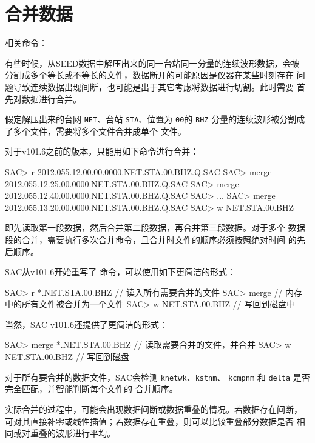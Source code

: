 \section{合并数据}
相关命令：

有些时候，从SEED数据中解压出来的同一台站同一分量的连续波形数据，会被
分割成多个等长或不等长的文件，数据断开的可能原因是仪器在某些时刻存在
问题导致连续数据出现间断，也可能是出于其它考虑将数据进行切割。此时需要
首先对数据进行合并。

假定解压出来的台网 \texttt{NET}、台站 \texttt{STA}、位置为 \texttt{00}的
\texttt{BHZ} 分量的连续波形被分割成了多个文件，需要将多个文件合并成单个
文件。

对于v101.6之前的版本，只能用如下命令进行合并：
\begin{SACCode}
SAC> r 2012.055.12.00.00.0000.NET.STA.00.BHZ.Q.SAC
SAC> merge 2012.055.12.25.00.0000.NET.STA.00.BHZ.Q.SAC
SAC> merge 2012.055.12.40.00.0000.NET.STA.00.BHZ.Q.SAC
SAC> ...
SAC> merge 2012.055.13.20.00.0000.NET.STA.00.BHZ.Q.SAC
SAC> w NET.STA.00.BHZ
\end{SACCode}
即先读取第一段数据，然后合并第二段数据，再合并第三段数据。对于多个
数据段的合并，需要执行多次合并命令，且合并时文件的顺序必须按照绝对时间
的先后顺序。

SAC从v101.6开始重写了  命令，可以使用如下更简洁的形式：
\begin{SACCode}
SAC> r *.NET.STA.00.BHZ        // 读入所有需要合并的文件
SAC> merge                     // 内存中的所有文件被合并为一个文件
SAC> w NET.STA.00.BHZ          // 写回到磁盘中
\end{SACCode}

当然，SAC v101.6还提供了更简洁的形式：
\begin{SACCode}
SAC> merge *.NET.STA.00.BHZ     // 读取需要合并的文件，并合并
SAC> w NET.STA.00.BHZ           // 写回到磁盘
\end{SACCode}

对于所有要合并的数据文件，SAC会检测 \texttt{knetwk}、\texttt{kstnm}、
\texttt{kcmpnm} 和 \texttt{delta} 是否完全匹配，并智能判断每个文件的
合并顺序。

实际合并的过程中，可能会出现数据间断或数据重叠的情况。若数据存在间断，
可对其直接补零或线性插值；若数据存在重叠，则可以比较重叠部分数据是否
相同或对重叠的波形进行平均。
